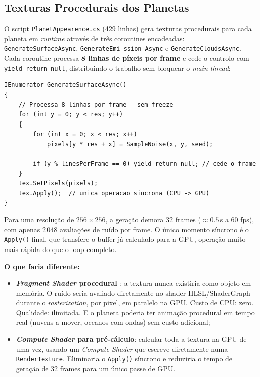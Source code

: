 \documentclass[12pt,a4paper]{article}
\begin{document}
\subsection{Texturas Procedurais dos Planetas}

O script \texttt{PlanetAppearence.cs} (429 linhas) gera texturas procedurais para cada planeta em \textit{runtime} atrav\'{e}s de tr\^{e}s coroutines encadeadas: \texttt{GenerateSurfaceAsync}, \texttt{GenerateEmi\ ssion Async} e \texttt{GenerateCloudsAsync}. Cada coroutine processa \textbf{8 linhas de p\'{i}xeis por frame} e cede o controlo com \texttt{yield return null}, distribuindo o trabalho sem bloquear o \textit{main thread}:

\begin{lstlisting}[caption={PlanetAppearence.cs - gera\c{c}\~{a}o de textura distribu\'{i}da por frames}]
IEnumerator GenerateSurfaceAsync()
{
    // Processa 8 linhas por frame - sem freeze
    for (int y = 0; y < res; y++)
    {
        for (int x = 0; x < res; x++)
            pixels[y * res + x] = SampleNoise(x, y, seed);

        if (y % linesPerFrame == 0) yield return null; // cede o frame
    }
    tex.SetPixels(pixels);
    tex.Apply();  // unica operacao sincrona (CPU -> GPU)
}
\end{lstlisting}

Para uma resolu\c{c}\~{a}o de $256 \times 256$, a gera\c{c}\~{a}o demora 32 frames ($\approx 0.5$\,s a 60 fps), com apenas 2\,048 avalia\c{c}\~{o}es de ru\'{i}do por frame. O \'{u}nico momento s\'{i}ncrono \'{e} o \texttt{Apply()} final, que transfere o buffer j\'{a} calculado para a GPU, opera\c{c}\~{a}o muito mais r\'{a}pida do que o loop completo.

\textbf{O que faria diferente:}

\begin{itemize}
  \item \textbf{\textit{Fragment Shader} procedural \cite{ebert2003,akenine2018}}: a textura nunca existiria como objeto em mem\'{o}ria. O ru\'{i}do seria avaliado diretamente no shader HLSL/ShaderGraph durante o \textit{rasterization}, por pixel, em paralelo na GPU. Custo de CPU: zero. Qualidade: ilimitada. E o planeta poderia ter anima\c{c}\~{a}o procedural em tempo real (nuvens a mover, oceanos com ondas) sem custo adicional;

  \item \textbf{\textit{Compute Shader} para pr\'{e}-c\'{a}lculo}: calcular toda a textura na GPU de uma vez, usando um \textit{Compute Shader} que escreve diretamente numa \texttt{RenderTexture}. Eliminaria o \texttt{Apply()} s\'{i}ncrono e reduziria o tempo de gera\c{c}\~{a}o de 32 frames para um \'{u}nico passe de GPU.
\end{itemize}
\end{document}
